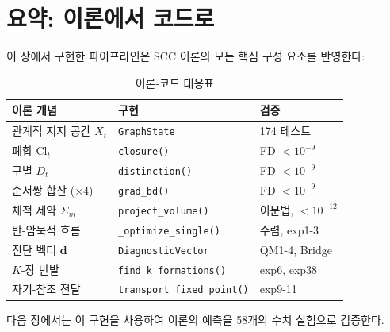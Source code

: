 \section{요약: 이론에서 코드로}
\label{sec:ch12-summary}

이 장에서 구현한 파이프라인은 SCC 이론의 모든 핵심 구성 요소를 반영한다:

\begin{table}[h]
\centering
\caption{이론-코드 대응표}
\label{tab:theory-code}
\begin{tabular}{lll}
\toprule
\textbf{이론 개념} & \textbf{구현} & \textbf{검증} \\
\midrule
관계적 지지 공간 $X_t$ & \texttt{GraphState} & 174 테스트 \\
폐합 $\mathrm{Cl}_t$ & \texttt{closure()} & FD $< 10^{-9}$ \\
구별 $D_t$ & \texttt{distinction()} & FD $< 10^{-9}$ \\
순서쌍 합산 ($\times 4$) & \texttt{grad\_bd()} & FD $< 10^{-9}$ \\
체적 제약 $\Sigma_m$ & \texttt{project\_volume()} & 이분법, $< 10^{-12}$ \\
반-암묵적 흐름 & \texttt{\_optimize\_single()} & 수렴, exp1-3 \\
진단 벡터 $\mathbf{d}$ & \texttt{DiagnosticVector} & QM1-4, Bridge \\
$K$-장 반발 & \texttt{find\_k\_formations()} & exp6, exp38 \\
자기-참조 전달 & \texttt{transport\_fixed\_point()} & exp9-11 \\
\bottomrule
\end{tabular}
\end{table}

다음 장에서는 이 구현을 사용하여 이론의 예측을 58개의 수치 실험으로 검증한다.
